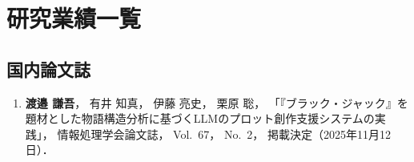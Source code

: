 \documentclass[a4j,12pt,dvipdfmx]{jsreport}
\begin{document}
\ifdefined\ismain\else
   \pagestyle{fancy}
   \lhead{\rightmark}
   \renewcommand{\chaptermark}[1]{\markboth{第\ \thechapter\ 章\ #1}{}}
   \setlength{\headheight}{16.5pt}
   \titleformat{\chapter}[hang]{\LARGE\bfseries}{\prechaptername\thechapter\postchaptername}{1em}{}
\fi

\chapter*{研究業績一覧} \label{performance}

\section*{国内論文誌}
\begin{enumerate}[label=(\roman*)]
   \item
         \textbf{渡邉 謙吾}，
         有井 知真，
         伊藤 亮史，
         栗原 聡，
         「『ブラック・ジャック』を題材とした物語構造分析に基づくLLMのプロット創作支援システムの実践」，
         情報処理学会論文誌，
         Vol.~67，
         No.~2，
         掲載決定（2025年11月12日）．
\end{enumerate}
\end{document}
